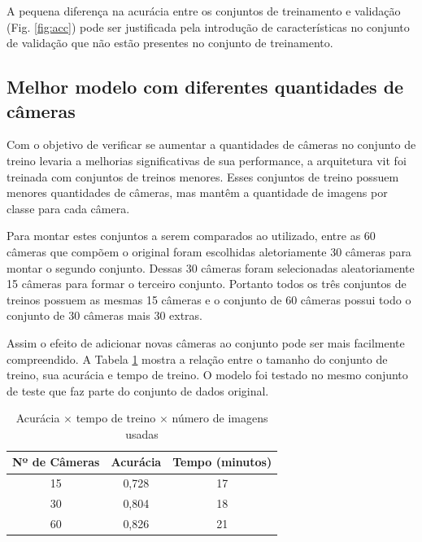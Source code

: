 A pequena diferença na acurácia entre os conjuntos de treinamento e validação (Fig. \ref{fig:acc}) pode ser justificada pela introdução de 
características no conjunto de validação que não estão presentes no conjunto de treinamento. 
\subsection{Melhor modelo com diferentes quantidades de câmeras}\label{sec:cameraquantity}

Com o objetivo de verificar se aumentar a quantidades de câmeras no conjunto de treino levaria a melhorias significativas de sua performance, 
a arquitetura \acrshort{vit} foi treinada com conjuntos de treinos menores. 
Esses conjuntos de treino possuem menores quantidades de câmeras, mas mantêm a quantidade de imagens por classe para cada câmera.

Para montar estes conjuntos a serem comparados ao utilizado, entre as 60 câmeras que compõem o original foram escolhidas aletoriamente 30 câmeras para montar o segundo conjunto.
Dessas 30 câmeras foram selecionadas aleatoriamente 15 câmeras para formar o terceiro conjunto.
Portanto todos os três conjuntos de treinos possuem as mesmas 15 câmeras e o conjunto de 60 câmeras possui todo o conjunto de 30 câmeras mais 30 extras.

Assim o efeito de adicionar novas câmeras ao conjunto pode ser mais facilmente compreendido.
A Tabela \ref{tab:trainingimages} mostra a relação entre o tamanho do conjunto de treino, sua acurácia e tempo de treino. 
O modelo foi testado no mesmo conjunto de teste que faz parte do conjunto de dados original.

\begin{table}[!ht]
\begin{center}
\caption{Acurácia $\times$ tempo de treino $\times$ número de imagens usadas}
\label{tab:trainingimages}
\begin{tabular}{c|cc}
\toprule
\textbf{\textbf{Nº de Câmeras}} & \textbf{Acurácia} & \textbf{Tempo (minutos)}\\
\midrule
15 &  0,728 & 17\\
30 & 0,804 & 18 \\
60 & 0,826 & 21 \\
\bottomrule
\end{tabular}
\end{center}
\end{table}

